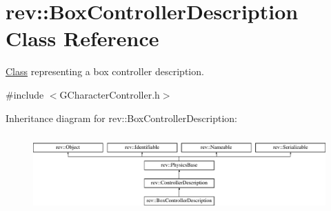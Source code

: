 \hypertarget{classrev_1_1_box_controller_description}{}\section{rev\+::Box\+Controller\+Description Class Reference}
\label{classrev_1_1_box_controller_description}


\mbox{\hyperlink{struct_class}{Class}} representing a box controller description.  




{\ttfamily \#include $<$G\+Character\+Controller.\+h$>$}

Inheritance diagram for rev\+::Box\+Controller\+Description\+:\begin{figure}[H]
\begin{center}
\leavevmode
\includegraphics[height=3.010753cm]{classrev_1_1_box_controller_description}
\end{center}
\end{figure}
